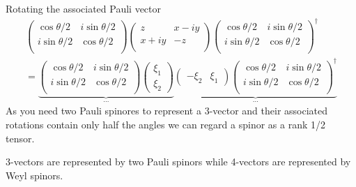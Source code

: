 \documentclass[../main.tex]{subfiles}
\begin{document}
Rotating the associated Pauli vector
\begin{align}
\left(
\begin{matrix}
\cos\theta/2 & i\sin\theta/2\\
i\sin\theta/2 & \cos\theta/2\\
\end{matrix}
\right)
\left(
\begin{matrix}
z& x-iy\\
x+iy&-z\\
\end{matrix}
\right)
\left(
\begin{matrix}
\cos\theta/2 & i\sin\theta/2\\
i\sin\theta/2 & \cos\theta/2\\
\end{matrix}
\right)^\dagger\\
=\underbrace{\left(
\begin{matrix}
\cos\theta/2 & i\sin\theta/2\\
i\sin\theta/2 & \cos\theta/2\\
\end{matrix}
\right)
\left(
\begin{matrix}
\xi_1 \\
\xi_2 
\end{matrix}
\right)}_{...}
\underbrace{
\left(
\begin{matrix}
-\xi_2&\xi_1 
\end{matrix}
\right)
\left(
\begin{matrix}
\cos\theta/2 & i\sin\theta/2\\
i\sin\theta/2 & \cos\theta/2\\
\end{matrix}
\right)^\dagger}_{...}
\end{align}
As you need two Pauli spinores to represent a 3-vector and their associated rotations contain only half the angles we can regard a spinor as a rank 1/2 tensor.

3-vectors are represented by two Pauli spinors while 4-vectors are represented by Weyl spinors.
\end{document}
